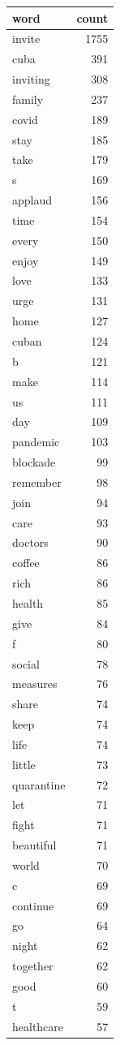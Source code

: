 \begin{tabular}{lr}
\toprule
word & count \\
\midrule
invite & 1755 \\
cuba & 391 \\
inviting & 308 \\
family & 237 \\
covid & 189 \\
stay & 185 \\
take & 179 \\
s & 169 \\
applaud & 156 \\
time & 154 \\
every & 150 \\
enjoy & 149 \\
love & 133 \\
urge & 131 \\
home & 127 \\
cuban & 124 \\
b & 121 \\
make & 114 \\
us & 111 \\
day & 109 \\
pandemic & 103 \\
blockade & 99 \\
remember & 98 \\
join & 94 \\
care & 93 \\
doctors & 90 \\
coffee & 86 \\
rich & 86 \\
health & 85 \\
give & 84 \\
f & 80 \\
social & 78 \\
measures & 76 \\
share & 74 \\
keep & 74 \\
life & 74 \\
little & 73 \\
quarantine & 72 \\
let & 71 \\
fight & 71 \\
beautiful & 71 \\
world & 70 \\
c & 69 \\
continue & 69 \\
go & 64 \\
night & 62 \\
together & 62 \\
good & 60 \\
t & 59 \\
healthcare & 57 \\
\bottomrule
\end{tabular}
